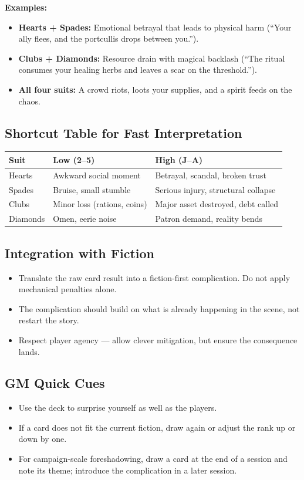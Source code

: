 \textbf{Examples:}
\begin{itemize}
  \item \textbf{Hearts + Spades:} Emotional betrayal that leads to physical harm (``Your ally flees, and the portcullis drops between you.'').
  \item \textbf{Clubs + Diamonds:} Resource drain with magical backlash (``The ritual consumes your healing herbs and leaves a scar on the threshold.'').
  \item \textbf{All four suits:} A crowd riots, loots your supplies, and a spirit feeds on the chaos.
\end{itemize}

\subsection{Shortcut Table for Fast Interpretation}

\begin{tabular}{@{}lll@{}}
\toprule
\textbf{Suit} & \textbf{Low (2–5)} & \textbf{High (J–A)} \\
\midrule
Hearts   & Awkward social moment & Betrayal, scandal, broken trust \\
Spades   & Bruise, small stumble & Serious injury, structural collapse \\
Clubs    & Minor loss (rations, coins) & Major asset destroyed, debt called \\
Diamonds & Omen, eerie noise & Patron demand, reality bends \\
\bottomrule
\end{tabular}

\subsection{Integration with Fiction}

\begin{itemize}
  \item Translate the raw card result into a fiction-first complication. Do not apply mechanical penalties alone.
  \item The complication should build on what is already happening in the scene, not restart the story.
  \item Respect player agency — allow clever mitigation, but ensure the consequence lands.
\end{itemize}

\subsection{GM Quick Cues}

\begin{itemize}
  \item Use the deck to surprise yourself as well as the players.
  \item If a card does not fit the current fiction, draw again or adjust the rank up or down by one.
  \item For campaign-scale foreshadowing, draw a card at the end of a session and note its theme; introduce the complication in a later session.
\end{itemize}

